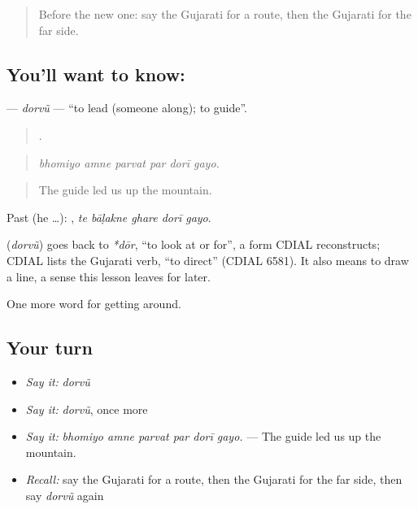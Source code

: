 \label{lesson:GU-C413-dorvu}



\begin{quote}
Before the new one: say the Gujarati for a route, then the Gujarati for the far side.
\end{quote}

\subsection*{You'll want to know: }
\textbf{} — \emph{dorvũ} — \textquotedblleft{}to lead (someone along); to guide\textquotedblright{}.

\begin{quote}
     .
\end{quote}

\begin{quote}
\emph{bhomiyo amne parvat par dorī gayo.}
\end{quote}

\begin{quote}
The guide led us up the mountain.
\end{quote}

Past (he …):     , \emph{te bāḷakne ghare dorī gayo}.

\begin{cousinweb}
\textbf{} (\emph{dorvũ}) goes back to \emph{*dōr}, \textquotedblleft{}to look at or for\textquotedblright{}, a form CDIAL reconstructs; CDIAL lists the Gujarati verb, \textquotedblleft{}to direct\textquotedblright{} (CDIAL 6581). It also means to draw a line, a sense this lesson leaves for later.
\end{cousinweb}

\begin{grammarlens}[title={What you've built}]
One more word for getting around.
\end{grammarlens}

\subsection*{Your turn}
\begin{itemize}
\raggedright
  \item \emph{Say it:} \emph{dorvũ}
  \item \emph{Say it:} \emph{dorvũ}, once more
  \item \emph{Say it:} \emph{bhomiyo amne parvat par dorī gayo.} — The guide led us up the mountain.
  \item \emph{Recall:} say the Gujarati for a route, then the Gujarati for the far side, then say \emph{dorvũ} again
\end{itemize}

